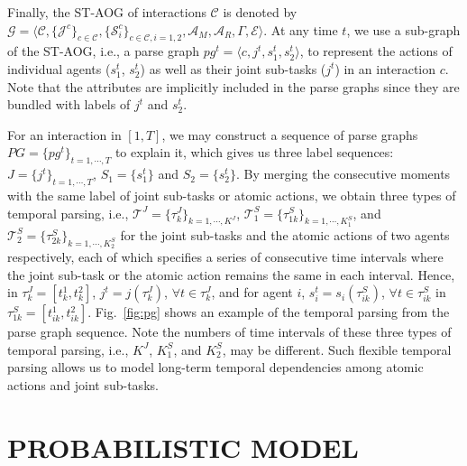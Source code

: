 \documentclass[letterpaper, 10 pt, conference]{ieeeconf}  %
\begin{document}
    Finally, the ST-AOG of interactions $\mathcal{C}$ is denoted by $\mathcal{G} = \langle \mathcal{C}, \{\mathcal{J}^c\}_{c \in \mathcal{C}}, \{\mathcal{S}_i^c\}_{c \in \mathcal{C}, i=1,2}, \mathcal{A}_M, \mathcal{A}_R, \Gamma,  \mathcal{E} \rangle$. At any time $t$, we use a sub-graph of the ST-AOG, i.e., a parse graph $pg^{t} = \langle c, j^t, s_1^t, s_2^t  \rangle$, to represent the actions of individual agents ($s_1^t$, $s_2^t$) as well as their joint sub-tasks ($j^t$) in an interaction $c$. Note that the attributes are implicitly included in the parse graphs since they are bundled with labels of $j^t$ and $s_2^t$. 
    
    For an interaction in $[1, T]$, we may construct a sequence of parse graphs $PG = \{pg^t\}_{t = 1,\cdots,T}$ to explain it, which gives us three label sequences: $J = \{j^t\}_{t = 1,\cdots,T}$, $S_1 = \{s_1^t\}$ and $S_2 = \{s_2^t\}$. By merging the consecutive moments with the same label of joint sub-tasks or atomic actions, we obtain three types of temporal parsing, i.e., $\mathcal{T}^J = \{\tau^J_k\}_{k = 1,\cdots,K^J}$, $\mathcal{T}_1^S = \{\tau^S_{1k}\}_{k = 1,\cdots,K_1^S}$, and $\mathcal{T}_2^S = \{\tau^S_{2k}\}_{k = 1,\cdots,K_2^S}$ for the joint sub-tasks and the atomic actions of two agents respectively, each of which specifies a series of consecutive time intervals where the joint sub-task or the atomic action remains the same in each interval. Hence, in $\tau_k^J = [t_k^1, t_k^2]$, $j^t = j(\tau_k^J)$, $\forall t \in \tau_k^J$, and for agent $i$, $s_i^t = s_i(\tau_{ik}^S)$, $\forall t \in \tau_{ik}^S$ in $\tau_{1k}^S = [t_{ik}^1, t_{ik}^2]$. Fig.~\ref{fig:pg} shows an example of the temporal parsing from the parse graph sequence. Note the numbers of time intervals of these three types of temporal parsing, i.e., $K^J$, $K_1^S$, and $K_2^S$, may be different. Such flexible temporal parsing allows us to model long-term temporal dependencies among atomic actions and joint sub-tasks. %
   
   
   
\section{PROBABILISTIC MODEL}
\end{document}
